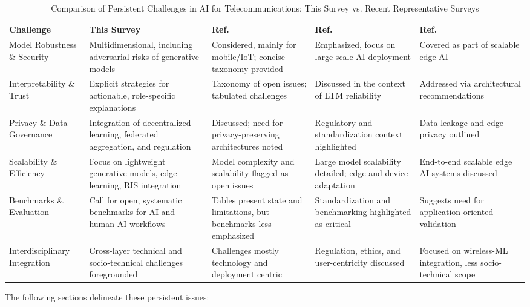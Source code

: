 \documentclass[sigconf]{acmart}
\begin{document}
\begin{table*}[htbp]
\centering
\caption{Comparison of Persistent Challenges in AI for Telecommunications: This Survey vs. Recent Representative Surveys}
\label{tab:challenges_comparison}
\begin{adjustbox}{max width=\textwidth}
\begin{tabular}{@{}lllll@{}}
\toprule
\textbf{Challenge} & \textbf{This Survey} & \textbf{Ref.~\cite{ref44}} & \textbf{Ref.~\cite{ref33}} & \textbf{Ref.~\cite{ref49}} \\
\midrule
Model Robustness \& Security & Multidimensional, including adversarial risks of generative models & Considered, mainly for mobile/IoT; concise taxonomy provided & Emphasized, focus on large-scale AI deployment & Covered as part of scalable edge AI \\
Interpretability \& Trust & Explicit strategies for actionable, role-specific explanations & Taxonomy of open issues; tabulated challenges & Discussed in the context of LTM reliability & Addressed via architectural recommendations \\
Privacy \& Data Governance & Integration of decentralized learning, federated aggregation, and regulation & Discussed; need for privacy-preserving architectures noted & Regulatory and standardization context highlighted & Data leakage and edge privacy outlined \\
Scalability \& Efficiency & Focus on lightweight generative models, edge learning, RIS integration & Model complexity and scalability flagged as open issues & Large model scalability detailed; edge and device adaptation & End-to-end scalable edge AI systems discussed \\
Benchmarks \& Evaluation & Call for open, systematic benchmarks for AI and human-AI workflows & Tables present state and limitations, but benchmarks less emphasized & Standardization and benchmarking highlighted as critical & Suggests need for application-oriented validation \\
Interdisciplinary Integration & Cross-layer technical and socio-technical challenges foregrounded & Challenges mostly technology and deployment centric & Regulation, ethics, and user-centricity discussed & Focused on wireless-ML integration, less socio-technical scope \\
\bottomrule
\end{tabular}
\end{adjustbox}
\end{table*}

The following sections delineate these persistent issues:
\end{document}
